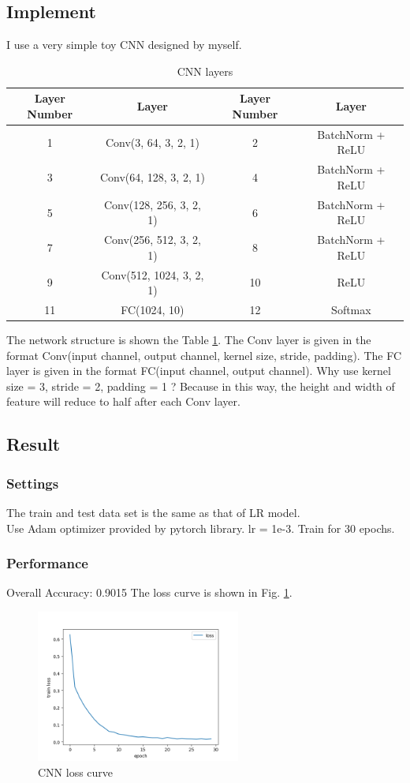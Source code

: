 \documentclass{article}
\begin{document}
\subsection{Implement}
I use a very simple toy CNN designed by myself.
\begin{table}[H]
    \centering
    \caption{CNN layers}
    \label{cnnlayers}
    \begin{tabular}{|cc|cc|}
        \hline
        Layer Number & Layer & Layer Number & Layer\\
        \hline
        1 & Conv(3, 64, 3, 2, 1) & 2 & BatchNorm + ReLU\\
        3 & Conv(64, 128, 3, 2, 1) & 4 & BatchNorm + ReLU\\
        5 & Conv(128, 256, 3, 2, 1) & 6 & BatchNorm + ReLU\\
        7 & Conv(256, 512, 3, 2, 1) & 8 & BatchNorm + ReLU\\
        9 & Conv(512, 1024, 3, 2, 1) & 10 & ReLU\\
        11 & FC(1024, 10) & 12 & Softmax\\
        \hline
    \end{tabular}
\end{table}
The network structure is shown the Table \ref{cnnlayers}. The Conv layer is given in the format Conv(input channel, output channel, kernel size, stride, padding). The FC layer is given in the format FC(input channel, output channel).
Why use kernel size = 3, stride = 2, padding = 1 ? Because in this way, the height and width of feature will reduce to half after each Conv layer. 
\subsection{Result}
\subsubsection{Settings}
The train and test data set is the same as that of LR model.\\
Use Adam optimizer provided by pytorch library. lr = 1e-3. Train for 30 epochs.\\
\subsubsection{Performance}
Overall Accuracy: 0.9015
The loss curve is shown in Fig. \ref{cnnloss}.
\begin{figure}[H]
    \centering
    \includegraphics[width=0.6\textwidth]{fig/cnn/1.png}
    \caption{CNN loss curve}
    \label{cnnloss}
\end{figure}
\end{document}

